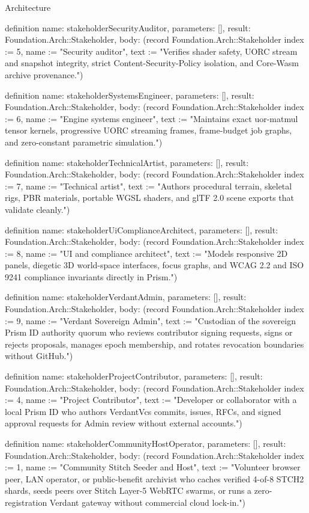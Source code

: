 \begin{lexlean}{Architecture}
\begin{semanticmodule}
definition{
  name: stakeholderSecurityAuditor,
  parameters: [],
  result: Foundation.Arch::Stakeholder,
  body: (record Foundation.Arch::Stakeholder {index := 5, name := "Security auditor", text := "Verifies shader safety, UORC stream and snapshot integrity, strict Content-Security-Policy isolation, and Core-Wasm archive provenance."})
}

definition{
  name: stakeholderSystemsEngineer,
  parameters: [],
  result: Foundation.Arch::Stakeholder,
  body: (record Foundation.Arch::Stakeholder {index := 6, name := "Engine systems engineer", text := "Maintains exact uor-matmul tensor kernels, progressive UORC streaming frames, frame-budget job graphs, and zero-constant parametric simulation."})
}

definition{
  name: stakeholderTechnicalArtist,
  parameters: [],
  result: Foundation.Arch::Stakeholder,
  body: (record Foundation.Arch::Stakeholder {index := 7, name := "Technical artist", text := "Authors procedural terrain, skeletal rigs, PBR materials, portable WGSL shaders, and glTF 2.0 scene exports that validate cleanly."})
}

definition{
  name: stakeholderUiComplianceArchitect,
  parameters: [],
  result: Foundation.Arch::Stakeholder,
  body: (record Foundation.Arch::Stakeholder {index := 8, name := "UI and compliance architect", text := "Models responsive 2D panels, diegetic 3D world-space interfaces, focus graphs, and WCAG 2.2 and ISO 9241 compliance invariants directly in Prism."})
}

definition{
  name: stakeholderVerdantAdmin,
  parameters: [],
  result: Foundation.Arch::Stakeholder,
  body: (record Foundation.Arch::Stakeholder {index := 9, name := "Verdant Sovereign Admin", text := "Custodian of the sovereign Prism ID authority quorum who reviews contributor signing requests, signs or rejects proposals, manages epoch membership, and rotates revocation boundaries without GitHub."})
}

definition{
  name: stakeholderProjectContributor,
  parameters: [],
  result: Foundation.Arch::Stakeholder,
  body: (record Foundation.Arch::Stakeholder {index := 4, name := "Project Contributor", text := "Developer or collaborator with a local Prism ID who authors VerdantVcs commits, issues, RFCs, and signed approval requests for Admin review without external accounts."})
}

definition{
  name: stakeholderCommunityHostOperator,
  parameters: [],
  result: Foundation.Arch::Stakeholder,
  body: (record Foundation.Arch::Stakeholder {index := 1, name := "Community Stitch Seeder and Host", text := "Volunteer browser peer, LAN operator, or public-benefit archivist who caches verified 4-of-8 STCH2 shards, seeds peers over Stitch Layer-5 WebRTC swarms, or runs a zero-registration Verdant gateway without commercial cloud lock-in."})
}


\end{semanticmodule}
\end{lexlean}
